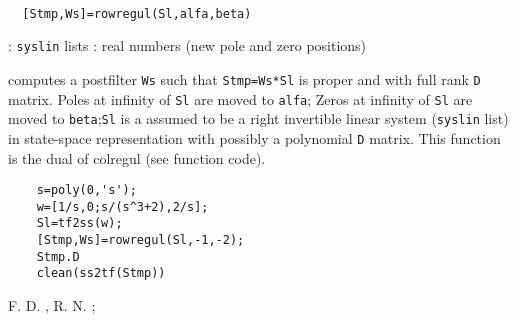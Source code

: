 \begin{mandesc}
   \\ %
\end{mandesc}
\begin{calling_sequence}
\begin{verbatim}
  [Stmp,Ws]=rowregul(Sl,alfa,beta)   
\end{verbatim}
\end{calling_sequence}
\begin{parameters}
  \begin{varlist}
    : \verb!syslin! lists
    : real numbers (new pole and zero positions)
  \end{varlist}
\end{parameters}
\begin{mandescription}
  computes a postfilter \verb!Ws! such that \verb!Stmp=Ws*Sl! is proper and with
  full rank \verb!D! matrix.  Poles at infinity of \verb!Sl! are moved to
  \verb!alfa!; Zeros at infinity of \verb!Sl! are moved to \verb!beta!;\verb!Sl!
  is a assumed to be a right invertible linear system (\verb!syslin! list) in
  state-space representation with possibly a polynomial \verb!D! matrix.  This
  function is the dual of colregul (see function code).
\end{mandescription}
\begin{examples}
  \begin{Verbatim}
    s=poly(0,'s');
    w=[1/s,0;s/(s^3+2),2/s];
    Sl=tf2ss(w);
    [Stmp,Ws]=rowregul(Sl,-1,-2);
    Stmp.D
    clean(ss2tf(Stmp))
  \end{Verbatim}
\end{examples}
\begin{manseealso}
     
\end{manseealso}
\begin{authors}
  F. D. , R. N. ;   
\end{authors}
